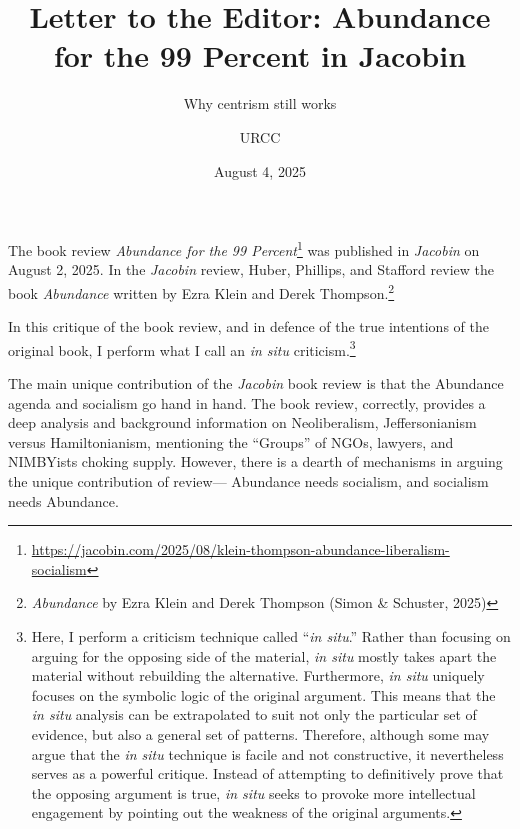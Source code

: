 \documentclass[12pt]{article}
\begin{document}
\title{Letter to the Editor: Abundance for the 99 Percent in Jacobin}

\subtitle{Why centrism still works}

\author{URCC}

\date{August 4, 2025}

\maketitle

\begin{preamble}
	The book review \textit{Abundance for the 99 Percent}\footnote{\href{https://jacobin.com/2025/08/klein-thompson-abundance-liberalism-socialism}{https://jacobin.com/2025/08/klein-thompson-abundance-liberalism-socialism}} was published in \textit{Jacobin} on August 2, 2025. In the \textit{Jacobin} review, Huber, Phillips, and Stafford review the book \textit{Abundance} written by Ezra Klein and Derek Thompson.\footnote{\textit{Abundance} by Ezra Klein and Derek Thompson (Simon \& Schuster, 2025)}

	In this critique of the book review, and in defence of the true intentions of the original book, I perform what I call an \textit{in situ} criticism.\footnote{Here, I perform a criticism technique called ``\textit{in situ}.'' Rather than focusing on arguing for the opposing side of the material, \textit{in situ} mostly takes apart the material without rebuilding the alternative. Furthermore, \textit{in situ} uniquely focuses on the symbolic logic of the original argument. This means that the \textit{in situ} analysis can be extrapolated to suit not only the particular set of evidence, but also a general set of patterns. Therefore, although some may argue that the \textit{in situ} technique is facile and not constructive, it nevertheless serves as a powerful critique. Instead of attempting to definitively prove that the opposing argument is true, \textit{in situ} seeks to provoke more intellectual engagement by pointing out the weakness of the original arguments.}
\end{preamble}

The main unique contribution of the \textit{Jacobin} book review is that the Abundance agenda and socialism go hand in hand. The book review, correctly, provides a deep analysis and background information on Neoliberalism, Jeffersonianism versus Hamiltonianism, mentioning the ``Groups'' of NGOs, lawyers, and NIMBYists choking supply. However, there is a dearth of mechanisms in arguing the unique contribution of review--- Abundance needs socialism, and socialism needs Abundance.
\end{document}
